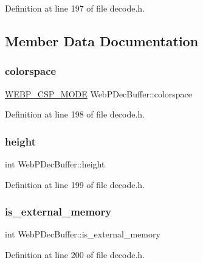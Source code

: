 Definition at line 197 of file decode.\+h.



\subsection{Member Data Documentation}
\mbox{\label{struct_web_p_dec_buffer_aefebde52238f0298e98c4581caf09bdc}} 
\subsubsection{\texorpdfstring{colorspace}{colorspace}}
{\footnotesize\ttfamily \mbox{\hyperlink{decode_8h_aa2b2301594d9da5ecc3e8890ac023e79}{W\+E\+B\+P\+\_\+\+C\+S\+P\+\_\+\+M\+O\+DE}} Web\+P\+Dec\+Buffer\+::colorspace}



Definition at line 198 of file decode.\+h.

\mbox{\label{struct_web_p_dec_buffer_aa939892accab65f2b973554742163821}} 
\subsubsection{\texorpdfstring{height}{height}}
{\footnotesize\ttfamily int Web\+P\+Dec\+Buffer\+::height}



Definition at line 199 of file decode.\+h.

\mbox{\label{struct_web_p_dec_buffer_a635d2008c693ed5a8d09b855e08d89d0}} 
\subsubsection{\texorpdfstring{is\_external\_memory}{is\_external\_memory}}
{\footnotesize\ttfamily int Web\+P\+Dec\+Buffer\+::is\+\_\+external\+\_\+memory}



Definition at line 200 of file decode.\+h.

